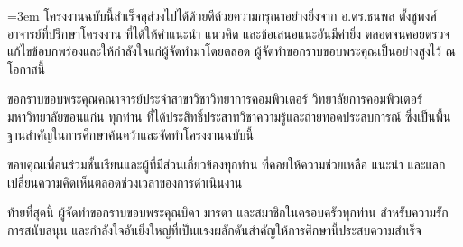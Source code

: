 
\emergencystretch=3em
โครงงานฉบับนี้สำเร็จลุล่วงไปได้ด้วยดีด้วยความกรุณาอย่างยิ่งจาก อ.ดร.ธนพล ตั้งชูพงศ์ อาจารย์ที่ปรึกษาโครงงาน ที่ได้ให้คำแนะนำ แนวคิด และข้อเสนอแนะอันมีค่ายิ่ง ตลอดจนคอยตรวจแก้ไขข้อบกพร่องและให้กำลังใจแก่ผู้จัดทำมาโดยตลอด ผู้จัดทำขอกราบขอบพระคุณเป็นอย่างสูงไว้ ณ โอกาสนี้

ขอกราบขอบพระคุณคณาจารย์ประจำสาขาวิชาวิทยาการคอมพิวเตอร์ วิทยาลัยการคอมพิวเตอร์ มหาวิทยาลัยขอนแก่น ทุกท่าน ที่ได้ประสิทธิ์ประสาทวิชาความรู้และถ่ายทอดประสบการณ์ ซึ่งเป็นพื้นฐานสำคัญในการศึกษาค้นคว้าและจัดทำโครงงานฉบับนี้

ขอบคุณเพื่อนร่วมชั้นเรียนและผู้ที่มีส่วนเกี่ยวข้องทุกท่าน ที่คอยให้ความช่วยเหลือ แนะนำ และแลกเปลี่ยนความคิดเห็นตลอดช่วงเวลาของการดำเนินงาน

ท้ายที่สุดนี้ ผู้จัดทำขอกราบขอบพระคุณบิดา มารดา และสมาชิกในครอบครัวทุกท่าน สำหรับความรัก การสนับสนุน และกำลังใจอันยิ่งใหญ่ที่เป็นแรงผลักดันสำคัญให้การศึกษานี้ประสบความสำเร็จ

